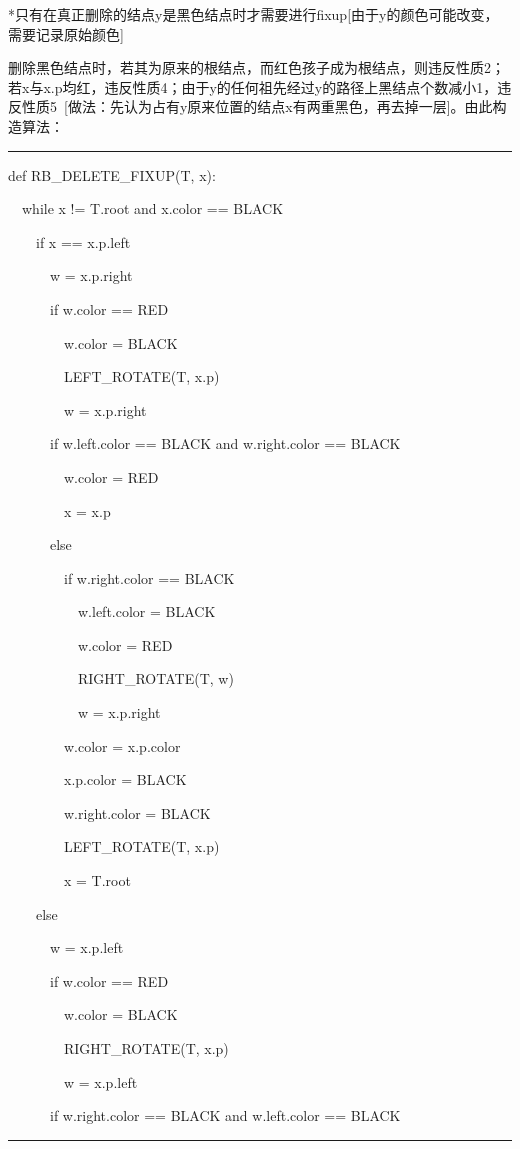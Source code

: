 \documentclass[a4paper,UTF8,fontset=windows]{ctexart}
\newenvironment{code}{\rule{36em}{0.1em}\setlength{\parindent}{1em}

}{

\setlength{\parindent}{0em}\rule{36em}{0.1em}}
\begin{document}
*\hspace{0em}只有在真正删除的结点y是黑色结点时才需要进行fixup[由于y的颜色可能改变，需要记录原始颜色]

删除黑色结点时，若其为原来的根结点，而红色孩子成为根结点，则违反性质2；若x与x.p均红，违反性质4；由于y的任何祖先经过y的路径上黑结点个数减小1，违反性质5\ [做法：先认为占有y原来位置的结点x有两重黑色，再去掉一层]。由此构造算法：

\begin{code}
def RB\_DELETE\_FIXUP(T, x):

\ \ while x != T.root and x.color == BLACK

\ \ \ \ if x == x.p.left

\ \ \ \ \ \ w = x.p.right

\ \ \ \ \ \ if w.color == RED

\ \ \ \ \ \ \ \ w.color = BLACK

\ \ \ \ \ \ \ \ LEFT\_ROTATE(T, x.p)

\ \ \ \ \ \ \ \ w = x.p.right

\ \ \ \ \ \ if w.left.color == BLACK and w.right.color == BLACK

\ \ \ \ \ \ \ \ w.color = RED

\ \ \ \ \ \ \ \ x = x.p

\ \ \ \ \ \ else

\ \ \ \ \ \ \ \ if w.right.color == BLACK

\ \ \ \ \ \ \ \ \ \ w.left.color = BLACK

\ \ \ \ \ \ \ \ \ \ w.color = RED

\ \ \ \ \ \ \ \ \ \ RIGHT\_ROTATE(T, w)

\ \ \ \ \ \ \ \ \ \ w = x.p.right

\ \ \ \ \ \ \ \ w.color = x.p.color

\ \ \ \ \ \ \ \ x.p.color = BLACK

\ \ \ \ \ \ \ \ w.right.color = BLACK

\ \ \ \ \ \ \ \ LEFT\_ROTATE(T, x.p)

\ \ \ \ \ \ \ \ x = T.root

\ \ \ \ else

\ \ \ \ \ \ w = x.p.left

\ \ \ \ \ \ if w.color == RED

\ \ \ \ \ \ \ \ w.color = BLACK

\ \ \ \ \ \ \ \ RIGHT\_ROTATE(T, x.p)

\ \ \ \ \ \ \ \ w = x.p.left

\ \ \ \ \ \ if w.right.color == BLACK and w.left.color == BLACK


\end{code}
\end{document}
